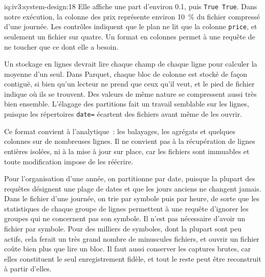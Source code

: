 \begin{solution}{iq:iv3:system-design:18}
Elle affiche une part d'environ 0.1, puis \texttt{True True}. Dans notre exécution, la colonne des prix représente environ 10~\% du fichier compressé d'une journée. Les contrôles indiquent que le plan ne lit que la colonne \texttt{price}, et seulement un fichier sur quatre. Un format en colonnes permet à une requête de ne toucher que ce dont elle a besoin.

Un stockage en lignes devrait lire chaque champ de chaque ligne pour calculer la moyenne d'un seul. Dans Parquet, chaque bloc de colonne est stocké de façon contiguë, si bien qu'un lecteur ne prend que ceux qu'il veut, et le pied de fichier indique où ils se trouvent. Des valeurs de même nature se compressent aussi très bien ensemble. L'élagage des partitions fait un travail semblable sur les lignes, puisque les répertoires \texttt{date=} écartent des fichiers avant même de les ouvrir.

Ce format convient à l'analytique~: les balayages, les agrégats et quelques colonnes sur de nombreuses lignes. Il ne convient pas à la récupération de lignes entières isolées, ni à la mise à jour sur place, car les fichiers sont immuables et toute modification impose de les réécrire.

Pour l'organisation d'une année, on partitionne par date, puisque la plupart des requêtes désignent une plage de dates et que les jours anciens ne changent jamais. Dans le fichier d'une journée, on trie par symbole puis par heure, de sorte que les statistiques de chaque groupe de lignes permettent à une requête d'ignorer les groupes qui ne concernent pas son symbole. Il n'est pas nécessaire d'avoir un fichier par symbole. Pour des milliers de symboles, dont la plupart sont peu actifs, cela ferait un très grand nombre de minuscules fichiers, et ouvrir un fichier coûte bien plus que lire un bloc. Il faut aussi conserver les captures brutes, car elles constituent le seul enregistrement fidèle, et tout le reste peut être reconstruit à partir d'elles.

\end{solution}

